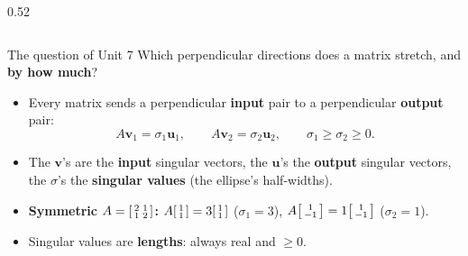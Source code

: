 \documentclass[aspectratio=169, 11pt]{beamer}
\newcommand{\uu}{\mathbf{u}}
\newcommand{\vv}{\mathbf{v}}
\begin{document}
\begin{frame}[t, plain]
\begin{columns}[T]
\begin{column}{0.52\textwidth}
    \end{column}
  \end{columns}
  \vspace{2pt}
  \begin{block}{The question of Unit 7}
    Which perpendicular directions does a matrix stretch, and \textbf{by how much}?
  \end{block}
\end{frame}

\begin{frame}[t, plain]
  \begin{itemize}
    \setlength{\itemsep}{6pt}
    \item Every matrix sends a perpendicular \textbf{input} pair to a perpendicular \textbf{output} pair:
          \[ A\vv_1=\sigma_1\uu_1,\qquad A\vv_2=\sigma_2\uu_2,\qquad \sigma_1\ge\sigma_2\ge0. \]
    \item The $\vv$'s are the \textbf{input} singular vectors, the $\uu$'s the \textbf{output} singular
          vectors, the $\sigma$'s the \textbf{singular values} (the ellipse's half-widths).
    \item \textbf{Symmetric $A=\begin{bsmallmatrix} 2 & 1\\ 1 & 2 \end{bsmallmatrix}$:}
          $A\begin{bsmallmatrix} 1\\1 \end{bsmallmatrix}=3\begin{bsmallmatrix} 1\\1 \end{bsmallmatrix}$
          ($\sigma_1=3$), \quad
          $A\begin{bsmallmatrix} 1\\-1 \end{bsmallmatrix}=1\begin{bsmallmatrix} 1\\-1 \end{bsmallmatrix}$
          ($\sigma_2=1$).
    \item Singular values are \textbf{lengths}: always real and $\ge0$.
  \end{itemize}
\end{frame}
\end{document}
